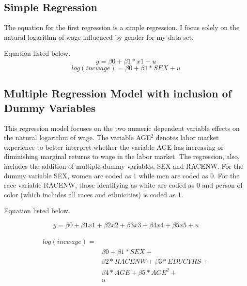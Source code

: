 \documentclass[12pt, English]{article}
\begin{document}
\subsection*{Simple Regression}
The equation for the first regression is a simple regression. I focus solely on the natural logarithm of wage influenced by gender for my data set. 

Equation listed below.
\begin{equation}
y = \beta0 + \beta1*x1 + u
\end{equation}
\begin{equation}
    log(incwage) = \beta0 + \beta1*SEX + u 
\end{equation}


\subsection*{Multiple Regression Model with inclusion of Dummy Variables}
This regression model focuses on the two numeric dependent variable effects on the natural logarithm of wage. The variable AGE$^2$ denotes labor market experience to better interpret whether the variable AGE has increasing or diminishing marginal returns to wage in the labor market. The regression, also, includes the addition of multiple dummy variables, SEX and RACENW. For the dummy variable SEX, women are coded as 1 while men are coded as 0. For the race variable RACENW, those identifying as white are coded as 0 and person of color (which includes all races and ethnicities) is coded as 1. 


Equation listed below. 

\begin{equation}
    y = \beta0 + \beta1x1+ \beta2x2+ \beta3x3 + \beta4x4 + \beta5x5 + u 
\end{equation}

\begin{equation}
\begin{aligned}
\begin{split}
log(incwage) = \\
& \beta0 + \beta1*SEX + \\
&  \beta2*RACENW+ \beta3*EDUCYRS + \\
&  \beta4*AGE + \beta5*AGE^2 +\\
&   u
\end{split}
\end{aligned}
\end{equation}
\end{document}
